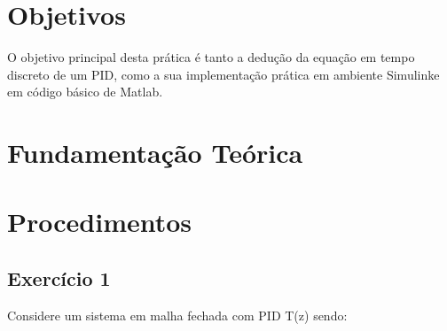 \section{Objetivos}
O objetivo principal desta prática é tanto a dedução da equação em tempo discreto de um PID, como a sua implementação prática em ambiente Simulink\textregistered e em código básico de Matlab\textregistered.

\section{Fundamentação Teórica}

\section{Procedimentos}
\subsection{Exercício 1}
Considere um sistema em malha fechada com PID T(z) sendo:

